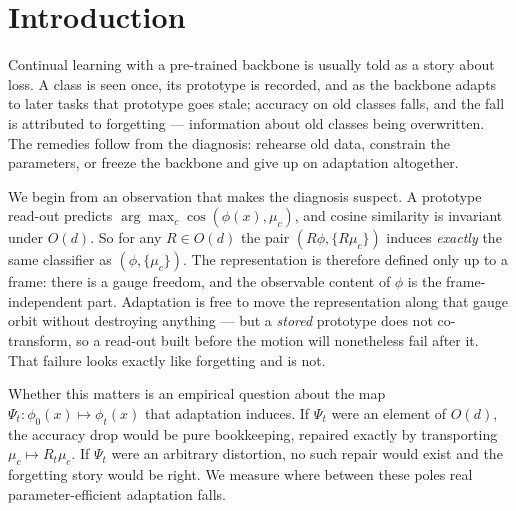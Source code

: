 %

\section{Introduction}

Continual learning with a pre-trained backbone is usually told as a story about
loss. A class is seen once, its prototype is recorded, and as the backbone
adapts to later tasks that prototype goes stale; accuracy on old classes falls,
and the fall is attributed to forgetting --- information about old classes being
overwritten. The remedies follow from the diagnosis: rehearse old data,
constrain the parameters, or freeze the backbone and give up on adaptation
altogether.

We begin from an observation that makes the diagnosis suspect. A prototype
read-out predicts $\arg\max_c \cos(\phi(x), \mu_c)$, and cosine similarity is
invariant under $O(d)$. So for any $R \in O(d)$ the pair
$(R\phi, \{R\mu_c\})$ induces \emph{exactly} the same classifier as
$(\phi, \{\mu_c\})$. The representation is therefore defined only up to a frame:
there is a gauge freedom, and the observable content of $\phi$ is the
frame-independent part. Adaptation is free to move the representation along that
gauge orbit without destroying anything --- but a \emph{stored} prototype does not
co-transform, so a read-out built before the motion will nonetheless fail after
it. That failure looks exactly like forgetting and is not.

Whether this matters is an empirical question about the map
$\Psi_t : \phi_0(x) \mapsto \phi_t(x)$ that adaptation induces. If $\Psi_t$ were
an element of $O(d)$, the accuracy drop would be pure bookkeeping, repaired
exactly by transporting $\mu_c \mapsto R_t \mu_c$. If $\Psi_t$ were an arbitrary
distortion, no such repair would exist and the forgetting story would be right.
We measure where between these poles real parameter-efficient adaptation falls.

